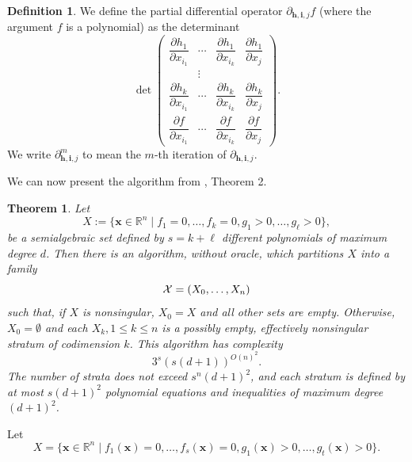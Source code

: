 \documentclass[
]{book}
\newtheorem{theorem}{Theorem}[chapter]
\theoremstyle{definition}
\newtheorem{definition}{Definition}[chapter]
\theoremstyle{definition}
\theoremstyle{definition}
\theoremstyle{definition}
\theoremstyle{remark}
\begin{document}
\begin{definition}
\citep[Definition 2]{gv1995}
We define the partial differential operator \(\partial_{\mathbf{h}, \mathbf{i}, j} f\) (where the argument \(f\) is a polynomial) as the determinant
\[
\det\begin{pmatrix}\dfrac{\partial h_{1}}{\partial x_{i_{1}}} & \cdots & \dfrac{\partial h_{1}}{\partial x_{i_{k}}} & \dfrac{\partial h_{1}}{\partial x_{j}}\\
 & \vdots\\
\dfrac{\partial h_{k}}{\partial x_{i_{1}}} & \cdots & \dfrac{\partial h_{k}}{\partial x_{i_{k}}} & \dfrac{\partial h_{k}}{\partial x_{j}}\\
\dfrac{\partial f}{\partial x_{i_{1}}} & \cdots & \dfrac{\partial f}{\partial x_{i_{k}}} & \dfrac{\partial f}{\partial x_{j}}
\end{pmatrix}.
\]
We write \(\partial^m_{\mathbf{h}, \mathbf{i}, j}\) to mean the \(m\)-th iteration of \(\partial_{\mathbf{h}, \mathbf{i}, j}\).
\end{definition}

We can now present the algorithm from \citet{gv1995}, Theorem 2.

\begin{theorem}
\protect\hypertarget{thm:strat}{}\label{thm:strat}Let
\[
X := \{ \mathbf{x} \in \mathbb{R}^n \mid f_1 = 0, \ldots, f_k = 0, g_1 > 0, \ldots, g_\ell > 0 \},
\]
be a semialgebraic set defined by \(s = k + \ell\) different polynomials of maximum degree \(d\).
Then there is an algorithm, without oracle, which partitions \(X\) into a family
\[
{\cal X} = (X_0, \ldots, X_n)
\]
such that, if \(X\) is nonsingular, \(X_0 = X\) and all other sets are empty.
Otherwise, \(X_0 = \emptyset\) and each \(X_k, 1 \le k \le n\) is a possibly empty, effectively nonsingular stratum of codimension \(k\).
This algorithm has complexity
\[
3^{s}\left(s(d+1)\right)^{O(n)^{2}}.
\]
The number of strata does not exceed \(s^{n} (d + 1)^2\), and each stratum is defined by at most \(s (d + 1)^2\) polynomial equations and inequalities of maximum degree \((d + 1)^2\).
\end{theorem}

Let \[
X = \{ \mathbf{x} \in \mathbb{R}^n \mid f_1(\mathbf{x}) = 0,\ldots,f_s(\mathbf{x}) = 0, g_1(\mathbf{x}) > 0, \ldots, g_t(\mathbf{x}) > 0 \}.
\]
\end{document}
